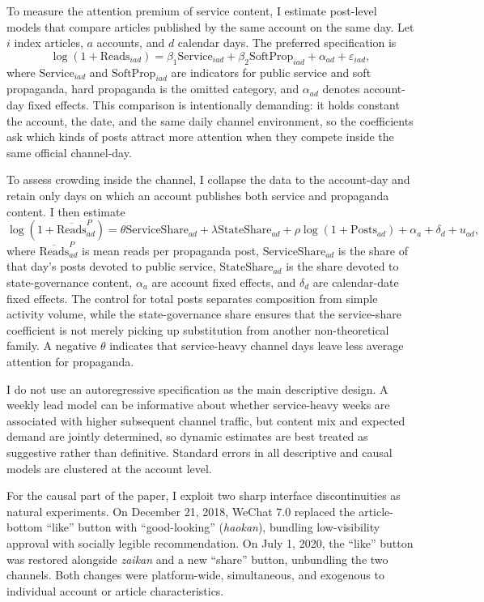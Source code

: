 \documentclass[12pt, american]{article}
\begin{document}
\begin{refsection}
To measure the attention premium of service content, I estimate post-level models that compare articles published by the same account on the same day. Let $i$ index articles, $a$ accounts, and $d$ calendar days. The preferred specification is
\[
\log(1+\text{Reads}_{iad}) =
\beta_{1}\text{Service}_{iad} +
\beta_{2}\text{SoftProp}_{iad} +
\alpha_{ad} + \varepsilon_{iad},
\]
where $\text{Service}_{iad}$ and $\text{SoftProp}_{iad}$ are indicators for public service and soft propaganda, hard propaganda is the omitted category, and $\alpha_{ad}$ denotes account-day fixed effects. This comparison is intentionally demanding: it holds constant the account, the date, and the same daily channel environment, so the coefficients ask which kinds of posts attract more attention when they compete inside the same official channel-day.

To assess crowding inside the channel, I collapse the data to the account-day and retain only days on which an account publishes both service and propaganda content. I then estimate
\[
\log(1+\overline{\text{Reads}}^{P}_{ad}) =
\theta \text{ServiceShare}_{ad} +
\lambda \text{StateShare}_{ad} +
\rho \log(1+\text{Posts}_{ad}) +
\alpha_{a} + \delta_{d} + u_{ad},
\]
where $\overline{\text{Reads}}^{P}_{ad}$ is mean reads per propaganda post, $\text{ServiceShare}_{ad}$ is the share of that day's posts devoted to public service, $\text{StateShare}_{ad}$ is the share devoted to state-governance content, $\alpha_{a}$ are account fixed effects, and $\delta_{d}$ are calendar-date fixed effects. The control for total posts separates composition from simple activity volume, while the state-governance share ensures that the service-share coefficient is not merely picking up substitution from another non-theoretical family. A negative $\theta$ indicates that service-heavy channel days leave less average attention for propaganda.

I do not use an autoregressive specification as the main descriptive design. A weekly lead model can be informative about whether service-heavy weeks are associated with higher subsequent channel traffic, but content mix and expected demand are jointly determined, so dynamic estimates are best treated as suggestive rather than definitive. Standard errors in all descriptive and causal models are clustered at the account level.

For the causal part of the paper, I exploit two sharp interface discontinuities as natural experiments. On December 21, 2018, WeChat 7.0 replaced the article-bottom ``like'' button with ``good-looking'' (\textit{haokan}), bundling low-visibility approval with socially legible recommendation. On July 1, 2020, the ``like'' button was restored alongside \textit{zaikan} and a new ``share'' button, unbundling the two channels. Both changes were platform-wide, simultaneous, and exogenous to individual account or article characteristics.


\end{refsection}
\end{document}
